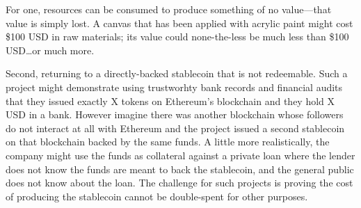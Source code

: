For one, resources can be consumed to produce something of no value---that value is simply lost. A canvas that has been applied with acrylic paint might cost \$100 USD in raw materials; its value could none-the-less be much less than \$100 USD\ldots or much more.

Second, returning to a directly-backed stablecoin that is not redeemable. Such a project might demonstrate using trustworhty bank records and financial audits that they issued exactly X tokens on Ethereum's blockchain and they hold X USD in a bank. However imagine there was another blockchain whose followers do not interact at all with Ethereum and the project issued a second stablecoin on that blockchain backed by the same funds. A little more realistically, the company might use the funds as collateral against a private loan where the lender does not know the funds are meant to back the stablecoin, and the general public does not know about the loan. The challenge for such projects is proving the cost of producing the stablecoin cannot be double-spent for other purposes.












